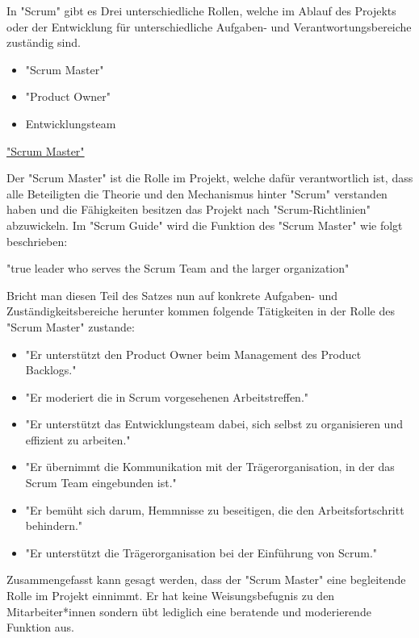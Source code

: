
In "Scrum" gibt es Drei unterschiedliche Rollen, welche im Ablauf des Projekts oder der Entwicklung für unterschiedliche Aufgaben- und Verantwortungsbereiche zuständig sind.

\begin{itemize}
    \item "Scrum Master"
    \item "Product Owner"
    \item Entwicklungsteam
\end{itemize}

\cite{Scrum}

\underline{"Scrum Master"}

Der "Scrum Master" ist die Rolle im Projekt, welche dafür verantwortlich ist, dass alle Beteiligten die Theorie und den Mechanismus hinter "Scrum" verstanden haben und die Fähigkeiten besitzen das Projekt nach "Scrum-Richtlinien" abzuwickeln. Im "Scrum Guide" wird die Funktion des "Scrum Master" wie folgt beschrieben:

"true leader who serves the Scrum Team and the larger organization" \cite{ScrumMaster}

Bricht man diesen Teil des Satzes nun auf konkrete Aufgaben- und Zuständigkeitsbereiche herunter kommen folgende Tätigkeiten in der Rolle des "Scrum Master" zustande:

\begin{itemize}
    \item "Er unterstützt den Product Owner beim Management des Product Backlogs." \cite{ScrumMaster}
    \item "Er moderiert die in Scrum vorgesehenen Arbeitstreffen." \cite{ScrumMaster}
    \item "Er unterstützt das Entwicklungsteam dabei, sich selbst zu organisieren und effizient zu arbeiten." \cite{ScrumMaster}
    \item "Er übernimmt die Kommunikation mit der Trägerorganisation, in der das Scrum Team eingebunden ist." \cite{ScrumMaster}
    \item "Er bemüht sich darum, Hemmnisse zu beseitigen, die den Arbeitsfortschritt behindern." \cite{ScrumMaster}
    \item "Er unterstützt die Trägerorganisation bei der Einführung von Scrum." \cite{ScrumMaster}
\end{itemize}

Zusammengefasst kann gesagt werden, dass der "Scrum Master" eine begleitende Rolle im Projekt einnimmt. Er hat keine Weisungsbefugnis zu den Mitarbeiter*innen sondern übt lediglich eine beratende und moderierende Funktion aus.

